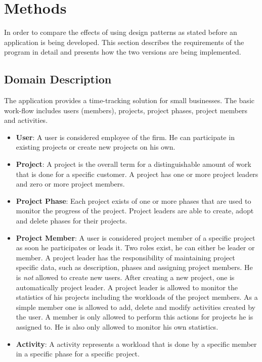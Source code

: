 \chapter{Methods}
In order to compare the effects of using design patterns as stated before an application is being developed. This section describes the requirements of the program in detail and presents how the two versions are being implemented.

\section{Domain Description}
The application provides a time-tracking solution for small businesses. The basic work-flow includes users (members), projects, project phases, project members and activities. 

\begin{itemize}
	\item \textbf{User}: A user is considered employee of the firm. He can participate in existing projects or create new projects on his own.
	\item \textbf{Project}: A project is the overall term for a distinguishable amount of work that is done for a specific customer. A project has one or more project leaders and zero or more project members.
	\item \textbf{Project Phase}: Each project exists of one or more phases that are used to monitor the progress of the project. Project leaders are able to create, adopt and delete phases for their projects. 
	\item \textbf{Project Member}: A user is considered project member of a specific project as soon he participates or leads it. Two roles exist, he can either be leader or member. A project leader has the responsibility of maintaining project specific data, such as description, phases and assigning project members. He is \emph{not} allowed to create new users. After creating a new project, one is automatically project leader. A project leader is allowed to monitor the statistics of his projects including the workloads of the project members. As a simple member one is allowed to add, delete and modify activities created by the user. A member is only allowed to perform this actions for projects he is assigned to. He is also only allowed to monitor his own statistics.
	\item \textbf{Activity}: A activity represents a workload that is done by a specific member in a specific phase for a specific project.
\end{itemize}


